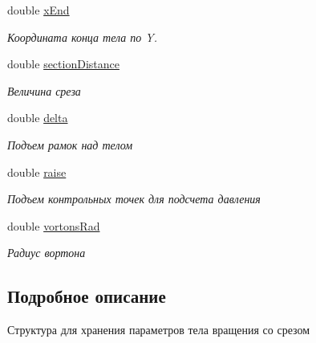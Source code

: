 \begin{DoxyCompactItemize}
double \mbox{\hyperlink{struct_rotation_cut_body_parameters_a24b8798599a42d15fe8f5c44a3b6eb47}{x\+End}}
\begin{DoxyCompactList}\small\item\em Координата конца тела по Y. \end{DoxyCompactList}\item 
\mbox{\label{struct_rotation_cut_body_parameters_a648af8abe3d57da949c0e49e05db3aa7}} 
double \mbox{\hyperlink{struct_rotation_cut_body_parameters_a648af8abe3d57da949c0e49e05db3aa7}{section\+Distance}}
\begin{DoxyCompactList}\small\item\em Величина среза \end{DoxyCompactList}\item 
\mbox{\label{struct_rotation_cut_body_parameters_a91d0603d57d81fbfceeeae0f31ddd158}} 
double \mbox{\hyperlink{struct_rotation_cut_body_parameters_a91d0603d57d81fbfceeeae0f31ddd158}{delta}}
\begin{DoxyCompactList}\small\item\em Подъем рамок над телом \end{DoxyCompactList}\item 
\mbox{\label{struct_rotation_cut_body_parameters_af34af8aad31cb1beb6c37d2d15a8078e}} 
double \mbox{\hyperlink{struct_rotation_cut_body_parameters_af34af8aad31cb1beb6c37d2d15a8078e}{raise}}
\begin{DoxyCompactList}\small\item\em Подъем контрольных точек для подсчета давления \end{DoxyCompactList}\item 
\mbox{\label{struct_rotation_cut_body_parameters_a0bbab464b845fc025bad073f32553678}} 
double \mbox{\hyperlink{struct_rotation_cut_body_parameters_a0bbab464b845fc025bad073f32553678}{vortons\+Rad}}
\begin{DoxyCompactList}\small\item\em Радиус вортона \end{DoxyCompactList}\end{DoxyCompactItemize}


\subsection{Подробное описание}
Структура для хранения параметров тела вращения со срезом 

